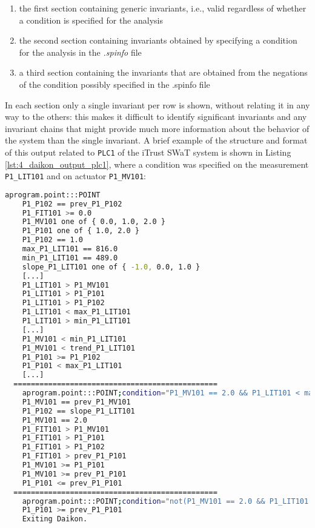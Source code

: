 \begin{enumerate}
	\item the first section containing generic invariants, i.e., valid regardless of whether a condition is specified for the analysis
	
	\item the second section containing invariants obtained by specifying a condition for the analysis in the \textit{.spinfo} file 
	
	\item a third section containing the invariants that are obtained from the negations of the condition possibly specified in the .spinfo file
\end{enumerate}

In each section only a single invariant per row is shown, without relating it in any way to the others: this makes it difficult to identify significant invariants and any invariant chains that might provide much more information about the behavior of the system than the single invariant.\newline
A brief example of the structure and format of this output related to \texttt{PLC1} of the iTrust SWaT system is shown in Listing \ref{lst:4_daikon_output_plc1}, where a condition was specified on the measurement \texttt{P1\_LIT101} and on actuator \texttt{P1\_MV101}: %

\begin{lstlisting}[language=bash,numbers=none,caption={Standard Daikon output for \texttt{PLC1} of the iTrust SWaT system},label=lst:4_daikon_output_plc1]
	aprogram.point:::POINT
	P1_P102 == prev_P1_P102
	P1_FIT101 >= 0.0
	P1_MV101 one of { 0.0, 1.0, 2.0 }
	P1_P101 one of { 1.0, 2.0 }
	P1_P102 == 1.0
	max_P1_LIT101 == 816.0
	min_P1_LIT101 == 489.0
	slope_P1_LIT101 one of { -1.0, 0.0, 1.0 }
	[...]
	P1_LIT101 > P1_MV101
	P1_LIT101 > P1_P101
	P1_LIT101 > P1_P102
	P1_LIT101 < max_P1_LIT101
	P1_LIT101 > min_P1_LIT101
	[...]
	P1_MV101 < min_P1_LIT101
	P1_MV101 < trend_P1_LIT101
	P1_P101 >= P1_P102
	P1_P101 < max_P1_LIT101
	[...]
  ===============================================
	aprogram.point:::POINT;condition="P1_MV101 == 2.0 && P1_LIT101 < max_P1_LIT101 - 16 && P1_LIT101 > min_P1_LIT101 + 15"
	P1_MV101 == prev_P1_MV101
	P1_P102 == slope_P1_LIT101
	P1_MV101 == 2.0
	P1_FIT101 > P1_MV101
	P1_FIT101 > P1_P101
	P1_FIT101 > P1_P102
	P1_FIT101 > prev_P1_P101
	P1_MV101 >= P1_P101
	P1_MV101 >= prev_P1_P101
	P1_P101 <= prev_P1_P101
  ===============================================
	aprogram.point:::POINT;condition="not(P1_MV101 == 2.0 && P1_LIT101 < max_P1_LIT101 - 16 && P1_LIT101 > min_P1_LIT101 + 15)"
	P1_P101 >= prev_P1_P101
	Exiting Daikon.
\end{lstlisting}

